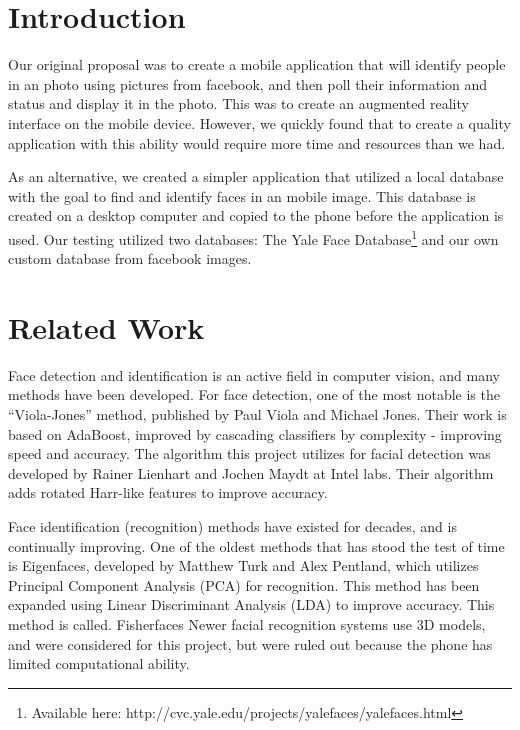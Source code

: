 \section{Introduction} %


Our original proposal was to create a mobile application that will
identify people in an photo using pictures from facebook, and then
poll their information and status and display it in the photo.  This
was to create an augmented reality interface on the mobile device.
However, we quickly found that to create a quality application with
this ability would require more time and resources than we had.

As an alternative, we created a simpler application that utilized a
local database with the goal to find and identify faces in an mobile
image.  This database is created on a desktop computer and copied to
the phone before the application is used.  Our testing utilized two
databases: The Yale Face Database\footnote{Available here:
  http://cvc.yale.edu/projects/yalefaces/yalefaces.html}\cite{YaleFace}
and our own custom database from facebook images.

\section{Related Work} %

Face detection and identification is an active field in computer
vision, and many methods have been developed.  For face detection, one
of the most notable is the ``Viola-Jones'' method, published by Paul
Viola and Michael Jones.\cite{ViolaJones} Their work is based on
AdaBoost\cite{AdaBoost}, improved by cascading classifiers by
complexity - improving speed and accuracy.  The algorithm this project
utilizes for facial detection was developed by Rainer Lienhart and
Jochen Maydt at Intel labs.\cite{Lienhart} Their algorithm adds
rotated Harr-like features to improve accuracy.

Face identification (recognition) methods have existed for decades,
and is continually improving.  One of the oldest methods that has
stood the test of time is Eigenfaces\cite{Eigenfaces}, developed by
Matthew Turk and Alex Pentland, which utilizes Principal Component
Analysis (PCA) for recognition.  This method has been expanded using
Linear Discriminant Analysis (LDA) to improve accuracy.  This method
is called. Fisherfaces \cite{Fisherfaces} Newer facial recognition
systems use 3D models\cite{3d}, and were considered for this project,
but were ruled out because the phone has limited computational
ability.

